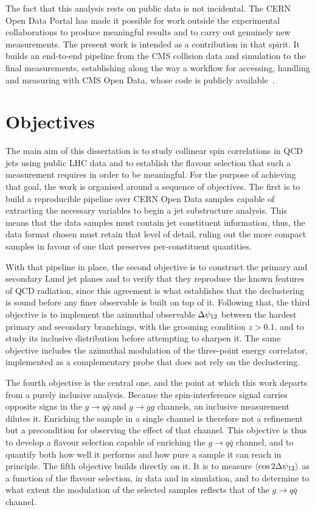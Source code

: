The fact that this analysis rests on public data is not incidental. The CERN Open
Data Portal has made it possible for work outside the experimental
collaborations to produce meaningful results and to carry out genuinely new
measurements. The present work is intended as a contribution in that spirit. It
builds an end-to-end pipeline from the CMS collision data and simulation to the
final measurements, establishing along the way a workflow for accessing, handling
and measuring with CMS Open Data, whose code is publicly
available~\cite{Mendonca:CMSJetSubstructure}.

\section{Objectives}
\label{sec:objetivos}

The main aim of this dissertation is to study collinear spin correlations in QCD
jets using public LHC data and to establish the flavour selection that such a
measurement requires in order to be meaningful. For the purpose of achieving that
goal, the work is organised around a sequence of objectives. The first is to build
a reproducible pipeline over CERN Open Data samples capable of extracting the
necessary variables to begin a jet substructure analysis. This means that the data
samples must contain jet constituent information, thus, the data format chosen must
retain that level of detail, ruling out the more compact samples in favour of one
that preserves per-constituent quantities.

With that pipeline in place, the second objective is to construct the primary and
secondary Lund jet planes and to verify that they reproduce the known features of
QCD radiation, since this agreement is what establishes that the declustering is
sound before any finer observable is built on top of it. Following that, the third
objective is to implement the azimuthal observable $\Delta\psi_{12}$ between the hardest
primary and secondary branchings, with the grooming condition $z > 0.1$, and to
study its inclusive distribution before attempting to sharpen it. The same
objective includes the azimuthal modulation of the three-point energy correlator,
implemented as a complementary probe that does not rely on the declustering.

The fourth objective is the central one, and the point at which this work departs
from a purely inclusive analysis. Because the spin-interference signal carries
opposite signs in the $g \to q\bar{q}$ and $g \to gg$ channels, an inclusive
measurement dilutes it. Enriching the sample in a single channel is therefore not
a refinement but a precondition for observing the effect of that channel. This
objective is thus to develop a flavour selection capable of enriching the
$g \to q\bar{q}$ channel, and to quantify both how well it performs and how pure a
sample it can reach in principle. The fifth objective builds directly on it. It is
to measure $\langle \cos 2\Delta\psi_{12} \rangle$ as a function of the flavour selection,
in data and in simulation, and to determine to what extent the modulation of the
selected samples reflects that of the $g \to q\bar{q}$ channel.

